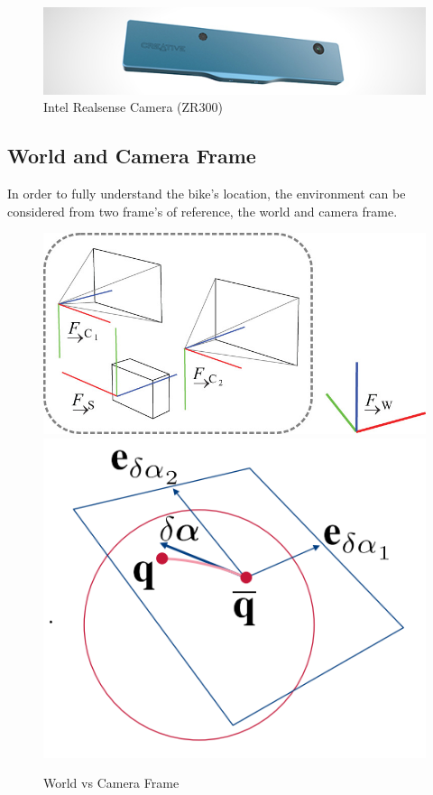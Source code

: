 \documentclass[a4paper,11pt,notitlepage]{article}
\begin{document}
\noindent \begin{figure}[h!]
\includegraphics[width = 1.0\hsize]{./figures/intel_realsense.jpg}
\caption{Intel Realsense Camera (ZR300)}
\label{realsense_camera}
\end{figure}

\subsection{World and Camera Frame}



In order to fully understand the bike's location, the environment can be considered from two frame's of reference, the world and camera frame. 
\newline


\noindent \begin{figure}[h!]
\includegraphics[width = 0.5\hsize]{figures/world_to_cam.jpg}
\includegraphics[width = 0.35\hsize]{figures/quaternions.png}
\caption{World vs Camera Frame \cite{Okvis_1}}
\label{quat_wcs}
\end{figure}
\end{document}

